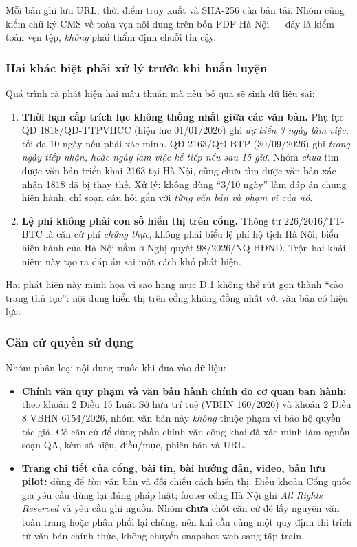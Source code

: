 Mỗi bản ghi lưu URL, thời điểm truy xuất và SHA-256 của bản tải. Nhóm cũng kiểm
chữ ký CMS về toàn vẹn nội dung trên bốn PDF Hà Nội --- đây là kiểm toàn vẹn tệp,
\emph{không} phải thẩm định chuỗi tin cậy.

\subsubsection{Hai khác biệt phải xử lý trước khi huấn luyện}

Quá trình rà phát hiện hai mâu thuẫn mà nếu bỏ qua sẽ sinh dữ liệu sai:

\begin{enumerate}[leftmargin=2em]
\item \textbf{Thời hạn cấp trích lục không thống nhất giữa các văn bản.} Phụ lục
QĐ 1818/QĐ-TTPVHCC (hiệu lực 01/01/2026) ghi \emph{dự kiến 3 ngày làm việc}, tối đa
10 ngày nếu phải xác minh. QĐ 2163/QĐ-BTP (30/09/2026) ghi \emph{trong ngày tiếp
nhận, hoặc ngày làm việc kế tiếp nếu sau 15 giờ}. Nhóm \emph{chưa} tìm được văn bản
triển khai 2163 tại Hà Nội, cũng chưa tìm được văn bản xác nhận 1818 đã bị thay
thế. Xử lý: không dùng ``3/10 ngày'' làm đáp án chung hiện hành; chỉ soạn câu hỏi
gắn với \emph{từng văn bản và phạm vi của nó}.
\item \textbf{Lệ phí không phải con số hiển thị trên cổng.} Thông tư
226/2016/TT-BTC là căn cứ phí \emph{chứng thực}, không phải biểu lệ phí hộ tịch Hà
Nội; biểu hiện hành của Hà Nội nằm ở Nghị quyết 98/2026/NQ-HĐND. Trộn hai khái niệm
này tạo ra đáp án sai một cách khó phát hiện.
\end{enumerate}

Hai phát hiện này minh họa vì sao hạng mục D.1 không thể rút gọn thành ``cào trang
thủ tục'': nội dung hiển thị trên cổng không đồng nhất với văn bản có hiệu lực.

\subsubsection{Căn cứ quyền sử dụng}

Nhóm phân loại nội dung trước khi đưa vào dữ liệu:

\begin{itemize}[leftmargin=2em]
\item \textbf{Chính văn quy phạm và văn bản hành chính do cơ quan ban hành:} theo
khoản 2 Điều 15 Luật Sở hữu trí tuệ (VBHN 160/2026) và khoản 2 Điều 8 VBHN
6154/2026, nhóm văn bản này \emph{không} thuộc phạm vi bảo hộ quyền tác giả. Có
căn cứ để dùng phần chính văn công khai đã xác minh làm nguồn soạn QA, kèm số hiệu,
điều/mục, phiên bản và URL.
\item \textbf{Trang chi tiết của cổng, bài tin, bài hướng dẫn, video, bản lưu
pilot:} dùng để \emph{tìm} văn bản và đối chiếu cách hiển thị. Điều khoản Cổng quốc
gia yêu cầu dùng lại đúng pháp luật; footer cổng Hà Nội ghi
\emph{All Rights Reserved} và yêu cầu ghi nguồn. Nhóm \textbf{chưa} chốt căn cứ để
lấy nguyên văn toàn trang hoặc phân phối lại chúng, nên khi cần cùng một quy định
thì trích từ văn bản chính thức, không chuyển snapshot web sang tập train.
\end{itemize}

